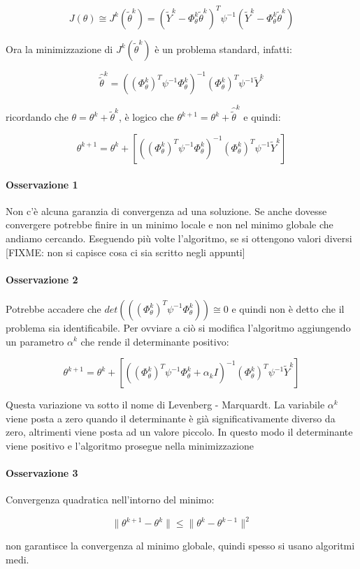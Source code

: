   \[ J(\theta)\cong J^k(\tilde{\theta}^k)=(\widetilde{Y}^k-\Phi_\theta^k\tilde{\theta}^k)^T\psi^{-1}(\widetilde{Y}^k-\Phi_\theta^k\tilde{\theta}^k) \]
  
Ora la minimizzazione di $J^k(\tilde{\theta}^k)$ è un problema standard, infatti:

  \[ \hat{\tilde{\theta}}^k=((\Phi_\theta^k)^T\psi^{-1}\Phi_\theta^k)^{-1}(\Phi_\theta^k)^T\psi^{-1}\widetilde{Y}^k \]
  
ricordando che $\theta=\theta^k+\tilde{\theta}^k$, è logico che $\theta^{k+1}=\theta^k+\hat{\tilde{\theta}}^k$ e quindi:

  \[ \theta^{k+1}=\theta^k+[((\Phi_\theta^k)^T\psi^{-1}\Phi_\theta^k)^{-1}(\Phi_\theta^k)^T\psi^{-1}\widetilde{Y}^k] \]
  
\paragraph{Osservazione 1} Non c'è alcuna garanzia di convergenza ad una soluzione. Se anche dovesse convergere potrebbe finire in un minimo locale e non nel minimo globale che andiamo cercando. Eseguendo più volte l'algoritmo, se si ottengono valori diversi [FIXME: non si capisce cosa ci sia scritto negli appunti]
\paragraph{Osservazione 2} Potrebbe accadere che $det(((\Phi_\theta^k)^T\psi^{-1}\Phi_\theta^k))\cong 0$ e quindi non è detto che il problema sia identificabile. Per ovviare a ciò si modifica l'algoritmo aggiungendo un parametro $\alpha^k$ che rende il determinante positivo:

  \[ \theta^{k+1}=\theta^k+[((\Phi_\theta^k)^T\psi^{-1}\Phi_\theta^k+\alpha_kI)^{-1}(\Phi_\theta^k)^T\psi^{-1}\widetilde{Y}^k] \]
  
Questa variazione va sotto il nome di Levenberg - Marquardt. La variabile $\alpha^k$ viene posta a zero quando il determinante è già significativamente diverso da zero, altrimenti viene posta ad un valore piccolo. In questo modo il determinante viene positivo e l'algoritmo prosegue nella minimizzazione
\paragraph{Osservazione 3} Convergenza quadratica nell'intorno del minimo:

  \[ \| \theta^{k+1}-\theta^k \|\leq \| \theta^k - \theta^{k-1}\|^2  \]
  
non garantisce la convergenza al minimo globale, quindi spesso si usano algoritmi medi.
